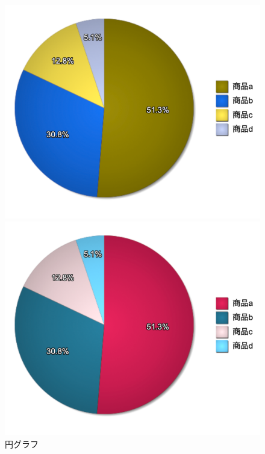 \begin{figure}[H]
\begin{minipage}[b]{.23\textwidth}
    \end{minipage}
    \begin{minipage}[b]{.23\textwidth}
        \centering
        \includegraphics[keepaspectratio,width=\textwidth]{../../10_UniversalDesign/no2_circle_RC_D.png}
    \end{minipage}
    \begin{minipage}[b]{.23\textwidth}
        \centering
        \includegraphics[keepaspectratio,width=\textwidth]{../../10_UniversalDesign/no2_circle_RC_T.png}
    \end{minipage}
    \caption{円グラフ}
\end{figure}